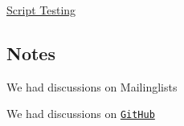 \begin{DoxyItemize}
\item \hyperlink{doc_decisions_script_testing_md}{Script Testing}
\end{DoxyItemize}

\subsection*{Notes}


\begin{DoxyItemize}
\item We had discussions on Mailinglists
\item We had discussions on \href{https://github.com/ElektraInitiative/libelektra/pull/26}{\tt Git\+Hub} 
\end{DoxyItemize}